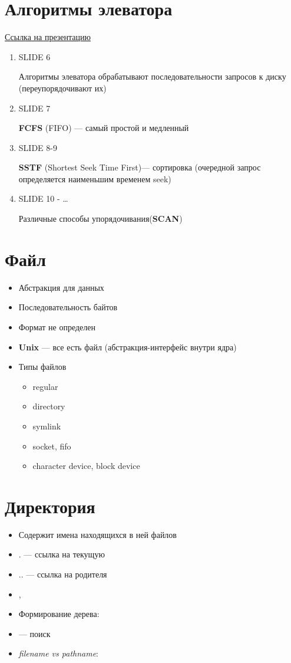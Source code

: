 \documentclass[../lectures.tex]{subfiles}
\begin{document}
\section{Алгоритмы элеватора}
\textcolor{blue}{\href{https://slideplayer.com/slide/5209336}{Ссылка на презентацию}}
\begin{enumerate}
    \item SLIDE 6
        
          Алгоритмы элеватора обрабатывают последовательности запросов к диску (переупорядочивают их)
    \item SLIDE 7

          \textbf{FCFS} (FIFO) --- самый простой и медленный
    \item SLIDE 8-9

          \textbf{SSTF} (Shortest Seek Time First)--- сортировка (очередной запрос определяется наименьшим временем seek)
    \item SLIDE 10 - \dots

          Различные способы упорядочивания(\textbf{SCAN})
\end{enumerate}

\section{Файл}
\begin{itemize}
    \item Абстракция для данных
    \item Последовательность байтов
    \item Формат не определен
    \item \textbf{Unix} --- все есть файл (абстракция-интерфейс внутри ядра)
    \item Типы файлов 
          \begin{itemize}
            \item regular
            \item directory
            \item symlink
            \item socket, fifo
            \item character device, block device
          \end{itemize}
\end{itemize}

\section{Директория}
\begin{itemize}
    \item Содержит имена находящихся в ней файлов
    \item $.$ --- ссылка на текущую
    \item $..$ --- ссылка на родителя
    \item {}, 
    \item Формирование дерева: 
    \item {} --- поиск
    \item \emph{filename vs pathname}: 
\end{itemize}
\end{document}
